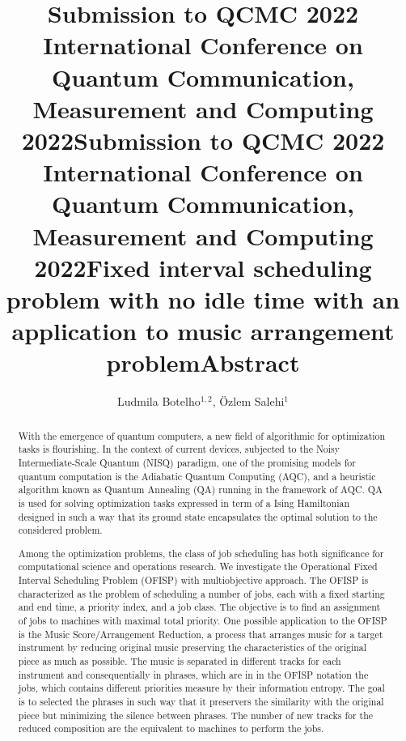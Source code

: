 \documentclass[aps,reprint]{revtex4-2}
\title@column %
\title{\normalsize Submission to QCMC 2022 \\ %
            International Conference on Quantum Communication,\\ 
            Measurement and Computing 2022}
\makeatletter
\newcommand{\printentry}{%
    \@author@finish%
    \title@column %
    \titleblock@produce %
    \suppressfloats[t] %
    \let\@AAC@list\@empty %
    \let\@AFF@list\@empty %
    \let\@AFG@list\@empty %
    \let\@address\@empty %
    \titlepage@sw %
    {\vfil\clearpage}%
}
\newcommand{\printheader}{%
    \title{\normalsize Submission to QCMC 2022 \\ %
            International Conference on Quantum Communication,\\ 
            Measurement and Computing 2022}
    \printentry
}
\makeatother
\begin{document}
\printheader



\title{Fixed interval scheduling problem with no idle time with an application to music arrangement problem} %
\author{Ludmila Botelho$^{1,2}$, \"Ozlem Salehi$^{1}$} %
{} %

\printentry
\title{\small Abstract}
\begin{abstract}
  
With the emergence of quantum computers, a new field of algorithmic for optimization tasks is flourishing. In the context of current devices, subjected to the Noisy Intermediate-Scale Quantum (NISQ) paradigm, one of the promising models for quantum computation is the Adiabatic Quantum Computing (AQC), and a heuristic algorithm known as Quantum Annealing (QA) running in the framework of AQC. QA is used for solving optimization tasks expressed in term of a Ising Hamiltonian designed in such a way that its ground state encapsulates the optimal solution to the considered problem. 

Among the optimization problems, the class of job scheduling has both significance for computational science and operations research. We investigate the Operational Fixed Interval Scheduling Problem (OFISP) with multiobjective approach. The OFISP is characterized as the problem of scheduling a number of jobs, each with a fixed starting and end time, a priority index, and a job class. The objective is to find an assignment of jobs to machines with maximal total priority. One possible application to the OFISP is the Music Score/Arrangement Reduction, a process that arranges music for a target instrument by reducing original music preserving the characteristics of the original piece as much as possible. The music is separated in different tracks for each instrument and consequentially in phrases, which are in in the OFISP notation the jobs, which contains different priorities measure by their information entropy. The goal is to selected the phrases in such way that it preservers the similarity with the original piece but minimizing the silence between phrases. The number of new tracks for the reduced composition are the equivalent to machines to perform the jobs. 


\end{abstract}
\end{document}

